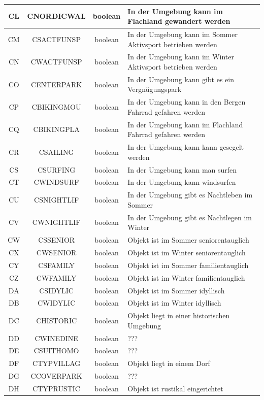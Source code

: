 \begin{longtable}{ | c | c | c | L{7.5cm} | }
	CL & CNORDICWAL & boolean & In der Umgebung kann im Flachland gewandert werden \\ \hline 
	CM & CSACTFUNSP & boolean & In der Umgebung kann im Sommer Aktivsport betrieben werden \\ \hline 
	CN & CWACTFUNSP & boolean & In der Umgebung kann im Winter Aktivsport betrieben werden \\ \hline 
	CO & CENTERPARK & boolean & In der Umgebung kann gibt es ein Vergnügungspark \\ \hline 
	CP & CBIKINGMOU & boolean & In der Umgebung kann in den Bergen Fahrrad gefahren werden \\ \hline 
	CQ & CBIKINGPLA & boolean & In der Umgebung kann im Flachland Fahrrad gefahren werden \\ \hline 
	CR & CSAILING & boolean & In der Umgebung kann kann gesegelt werden \\ \hline 
	CS & CSURFING & boolean & In der Umgebung kann man surfen \\ \hline 
	CT & CWINDSURF & boolean & In der Umgebung kann windsurfen \\ \hline 
	CU & CSNIGHTLIF & boolean & In der Umgebung gibt es Nachtleben im Sommer \\ \hline 
	CV & CWNIGHTLIF & boolean & In der Umgebung gibt es Nachtlegen im Winter \\ \hline 
	CW & CSSENIOR & boolean & Objekt ist im Sommer seniorentauglich \\ \hline 
	CX & CWSENIOR & boolean & Objekt ist im Winter seniorentauglich \\ \hline 
	CY & CSFAMILY & boolean & Objekt ist im Sommer familientauglich \\ \hline 
	CZ & CWFAMILY & boolean & Objekt ist im Winter familientauglich \\ \hline 
	DA & CSIDYLIC & boolean & Objekt ist im Sommer idyllisch \\ \hline 
	DB & CWIDYLIC & boolean & Objekt ist im Winter idyllisch \\ \hline 
	DC & CHISTORIC & boolean & Objekt liegt in einer historischen Umgebung \\ \hline 
	DD & CWINEDINE & boolean & ??? \\ \hline 
	DE & CSUITHOMO & boolean & ??? \\ \hline 
	DF & CTYPVILLAG & boolean & Objekt liegt in einem Dorf \\ \hline 
	DG & CCOVERPARK & boolean & ??? \\ \hline 
	DH & CTYPRUSTIC & boolean & Objekt ist rustikal eingerichtet \\ \hline 

\end{longtable}
